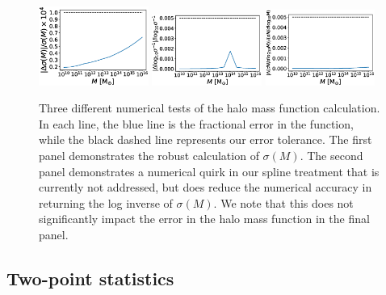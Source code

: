 \documentclass[\docopts]{\docclass}
\begin{document}
\begin{figure}
\includegraphics[width=0.32\textwidth]{hmf_model1.eps}
\includegraphics[width=0.32\textwidth]{hmf_model1_b.eps}
\includegraphics[width=0.32\textwidth]{hmf_model1_c.eps}
\caption{Three different numerical tests of the halo mass function calculation. In each line, the blue line is the fractional error in the function, while the black dashed line represents our error tolerance. The first panel demonstrates the robust calculation of $\sigma(M)$. The second panel demonstrates a numerical quirk in our spline treatment that is currently not addressed, but does reduce the numerical accuracy in returning the log inverse of $\sigma(M)$. We note that this does not significantly impact the error in the halo mass function in the final panel.}
\label{fig:hmf}
\end{figure}

\subsection{Two-point statistics}
\end{document}
